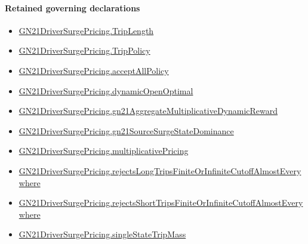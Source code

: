 \documentclass[10pt]{article}
\begin{document}
\paragraph{Retained governing declarations}
\begin{itemize}\raggedright
\item \hyperlink{governing-declaration-a616c143f22cf2bc}{GN21\allowbreak{}Driver\allowbreak{}Surge\allowbreak{}Pricing.\allowbreak{}Trip\allowbreak{}Length}
\item \hyperlink{governing-declaration-4312ad4cb899871f}{GN21\allowbreak{}Driver\allowbreak{}Surge\allowbreak{}Pricing.\allowbreak{}Trip\allowbreak{}Policy}
\item \hyperlink{governing-declaration-e94c9281d4f4b12d}{GN21\allowbreak{}Driver\allowbreak{}Surge\allowbreak{}Pricing.\allowbreak{}accept\allowbreak{}All\allowbreak{}Policy}
\item \hyperlink{governing-declaration-abf3520e319b0ec7}{GN21\allowbreak{}Driver\allowbreak{}Surge\allowbreak{}Pricing.\allowbreak{}dynamic\allowbreak{}Open\allowbreak{}Optimal}
\item \hyperlink{governing-declaration-e982f9fb888f8f4b}{GN21\allowbreak{}Driver\allowbreak{}Surge\allowbreak{}Pricing.\allowbreak{}gn21\allowbreak{}Aggregate\allowbreak{}Multiplicative\allowbreak{}Dynamic\allowbreak{}Reward}
\item \hyperlink{governing-declaration-3496ffa016b3bb1e}{GN21\allowbreak{}Driver\allowbreak{}Surge\allowbreak{}Pricing.\allowbreak{}gn21\allowbreak{}Source\allowbreak{}Surge\allowbreak{}State\allowbreak{}Dominance}
\item \hyperlink{governing-declaration-dc7605f7de245fe1}{GN21\allowbreak{}Driver\allowbreak{}Surge\allowbreak{}Pricing.\allowbreak{}multiplicative\allowbreak{}Pricing}
\item \hyperlink{governing-declaration-6d52ca98e8d5bcd8}{GN21\allowbreak{}Driver\allowbreak{}Surge\allowbreak{}Pricing.\allowbreak{}rejects\allowbreak{}Long\allowbreak{}Trips\allowbreak{}Finite\allowbreak{}Or\allowbreak{}Infinite\allowbreak{}Cutoff\allowbreak{}Almost\allowbreak{}Everywhere}
\item \hyperlink{governing-declaration-a9c0d3b1cf0da7ed}{GN21\allowbreak{}Driver\allowbreak{}Surge\allowbreak{}Pricing.\allowbreak{}rejects\allowbreak{}Short\allowbreak{}Trips\allowbreak{}Finite\allowbreak{}Or\allowbreak{}Infinite\allowbreak{}Cutoff\allowbreak{}Almost\allowbreak{}Everywhere}
\item \hyperlink{governing-declaration-1c88cf5996e161d3}{GN21\allowbreak{}Driver\allowbreak{}Surge\allowbreak{}Pricing.\allowbreak{}single\allowbreak{}State\allowbreak{}Trip\allowbreak{}Mass}
\end{itemize}
\end{document}

